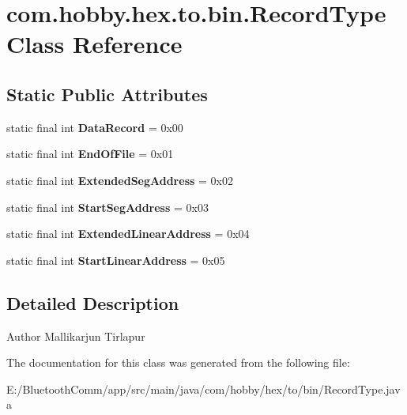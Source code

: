 \hypertarget{classcom_1_1hobby_1_1hex_1_1to_1_1bin_1_1_record_type}{}\section{com.\+hobby.\+hex.\+to.\+bin.\+Record\+Type Class Reference}
\label{classcom_1_1hobby_1_1hex_1_1to_1_1bin_1_1_record_type}
\subsection*{Static Public Attributes}
\begin{DoxyCompactItemize}
\item 
\mbox{\label{classcom_1_1hobby_1_1hex_1_1to_1_1bin_1_1_record_type_a1e24140590cc2c2b284a8940f03a5a21}} 
static final int {\bfseries Data\+Record} = 0x00
\item 
\mbox{\label{classcom_1_1hobby_1_1hex_1_1to_1_1bin_1_1_record_type_aba956f5bb0653884fb8aa32a40305625}} 
static final int {\bfseries End\+Of\+File} = 0x01
\item 
\mbox{\label{classcom_1_1hobby_1_1hex_1_1to_1_1bin_1_1_record_type_a2583a13359dad317521668213a4b62a8}} 
static final int {\bfseries Extended\+Seg\+Address} = 0x02
\item 
\mbox{\label{classcom_1_1hobby_1_1hex_1_1to_1_1bin_1_1_record_type_aeb6dc16eda59b62f9080f8dc1ed3c128}} 
static final int {\bfseries Start\+Seg\+Address} = 0x03
\item 
\mbox{\label{classcom_1_1hobby_1_1hex_1_1to_1_1bin_1_1_record_type_ae9f71959733a4a1d29534c9cd7797f86}} 
static final int {\bfseries Extended\+Linear\+Address} = 0x04
\item 
\mbox{\label{classcom_1_1hobby_1_1hex_1_1to_1_1bin_1_1_record_type_a6a492d8aaecd45518fbb206a00acc995}} 
static final int {\bfseries Start\+Linear\+Address} = 0x05
\end{DoxyCompactItemize}


\subsection{Detailed Description}
\begin{DoxyAuthor}{Author}
Mallikarjun Tirlapur 
\end{DoxyAuthor}


The documentation for this class was generated from the following file\+:\begin{DoxyCompactItemize}
\item 
E\+:/\+Bluetooth\+Comm/app/src/main/java/com/hobby/hex/to/bin/Record\+Type.\+java\end{DoxyCompactItemize}
